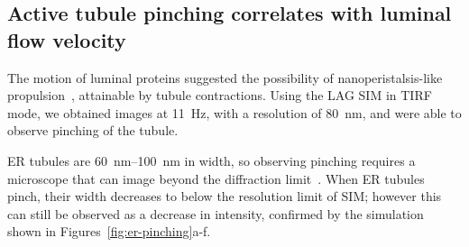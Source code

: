 
\subsection{Active tubule pinching correlates with luminal flow velocity}
The motion of luminal proteins suggested the possibility of nanoperistalsis-like propulsion~\cite{nadeem2014mathematical}, attainable by tubule contractions. 
Using the LAG SIM in TIRF mode, we obtained images at \SI{11}{\hertz}, with a resolution of \SI{80}{\nano\metre}, and were able to observe pinching of the tubule. 

ER tubules are \SIrange{60}{100}{\nano\metre} in width, so observing pinching requires a microscope that can image beyond the diffraction limit~\cite{lippincott1989rapid}. 
When ER tubules pinch, their width decreases to below the resolution limit of SIM; however this can still be observed as a decrease in intensity, confirmed by the simulation shown in Figures~\ref{fig:er-pinching}a-f. 

